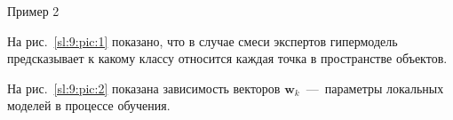 \documentclass[9pt,pdf,hyperref={unicode}]{beamer}
\begin{document}
\begin{frame}{Пример 2}
\justifying
\begin{figure}
\end{figure}
На рис.~\ref{sl:9:pic:1} показано, что в случае смеси экспертов гипермодель предсказывает к какому классу относится каждая точка в пространстве объектов.

На рис.~\ref{sl:9:pic:2} показана зависимость векторов $\mathbf{w}_{k}$~---~параметры локальных моделей в процессе обучения.

\end{frame}
\end{document}
